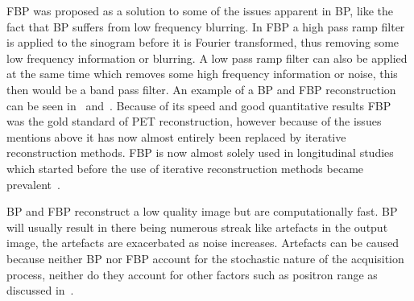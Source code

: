             \gls{FBP} was proposed as a solution to some of the issues apparent in \gls{BP}, like the fact that \gls{BP} suffers from low frequency blurring. In \gls{FBP} a high pass ramp filter is applied to the sinogram before it is Fourier transformed, thus removing some low frequency information or blurring. A low pass ramp filter can also be applied at the same time which removes some high frequency information or noise, this then would be a band pass filter. An example of a \gls{BP} and \gls{FBP} reconstruction can be seen in~ and~. Because of its speed and good quantitative results \gls{FBP} was the gold standard of \gls{PET} reconstruction, however because of the issues mentions above it has now almost entirely been replaced by iterative reconstruction methods. \gls{FBP} is now almost solely used in longitudinal studies which started before the use of iterative reconstruction methods became prevalent~\parencite{FBPReviewBib, Tong2010_review}.
            
            \gls{BP} and \gls{FBP} reconstruct a low quality image but are computationally fast. \gls{BP} will usually result in there being numerous streak like artefacts in the output image, the artefacts are exacerbated as noise increases. Artefacts can be caused because neither \gls{BP} nor \gls{FBP} account for the stochastic nature of the acquisition process, neither do they account for other factors such as positron range as discussed in~.
            
            
